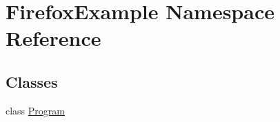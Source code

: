 \hypertarget{namespace_firefox_example}{}\section{Firefox\+Example Namespace Reference}
\label{namespace_firefox_example}
\subsection*{Classes}
\begin{DoxyCompactItemize}
\item 
class \hyperlink{class_firefox_example_1_1_program}{Program}
\end{DoxyCompactItemize}
